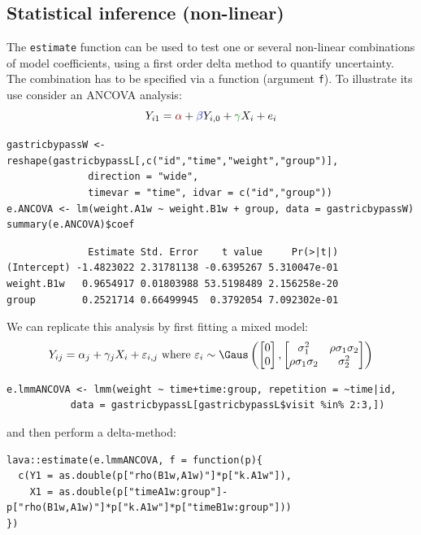 \documentclass[12pt]{article}
\newcommand{\darkblue}{blue!80!black}
\newcommand{\darkgreen}{green!50!black}
\newcommand{\darkred}{red!50!black}
\begin{document}
\clearpage

\subsection{Statistical inference (non-linear)}
\label{sec:org9efc1f3}

The \texttt{estimate} function can be used to test one or several non-linear
combinations of model coefficients, using a first order delta method
to quantify uncertainty. The combination has to be specified via a
function (argument \texttt{f}). To illustrate its use consider an ANCOVA
analysis:
\[ Y_{i1} = \textcolor{\darkred}{\alpha} + \textcolor{\darkblue}{\beta} Y_{i,0} + \textcolor{\darkgreen}{\gamma} X_{i} + e_{i} \]

\lstset{language=r,label= ,caption= ,captionpos=b,numbers=none}
\begin{lstlisting}
gastricbypassW <- reshape(gastricbypassL[,c("id","time","weight","group")],
			  direction = "wide",
			  timevar = "time", idvar = c("id","group"))
e.ANCOVA <- lm(weight.A1w ~ weight.B1w + group, data = gastricbypassW)
summary(e.ANCOVA)$coef
\end{lstlisting}

\begin{verbatim}
              Estimate Std. Error    t value     Pr(>|t|)
(Intercept) -1.4823022 2.31781138 -0.6395267 5.310047e-01
weight.B1w   0.9654917 0.01803988 53.5198489 2.156258e-20
group        0.2521714 0.66499945  0.3792054 7.092302e-01
\end{verbatim}


We can replicate this analysis by first fitting a mixed model:
\[ Y_{ij} = \alpha_j + \gamma_j X_{i} + \varepsilon_{i,j} \text{ where } \varepsilon_i \sim \Gaus \left( \begin{bmatrix} 0 \\ 0 \end{bmatrix}, \begin{bmatrix} \sigma^2_1 & \rho \sigma_1 \sigma_2 \\ \rho \sigma_1 \sigma_2 & \sigma^2_2 \end{bmatrix} \right) \]
\lstset{language=r,label= ,caption= ,captionpos=b,numbers=none}
\begin{lstlisting}
e.lmmANCOVA <- lmm(weight ~ time+time:group, repetition = ~time|id,
		   data = gastricbypassL[gastricbypassL$visit %in% 2:3,])
\end{lstlisting}

and then perform a delta-method:
\lstset{language=r,label= ,caption= ,captionpos=b,numbers=none}
\begin{lstlisting}
lava::estimate(e.lmmANCOVA, f = function(p){
  c(Y1 = as.double(p["rho(B1w,A1w)"]*p["k.A1w"]),
    X1 = as.double(p["timeA1w:group"]-p["rho(B1w,A1w)"]*p["k.A1w"]*p["timeB1w:group"]))
})
\end{lstlisting}
\end{document}
